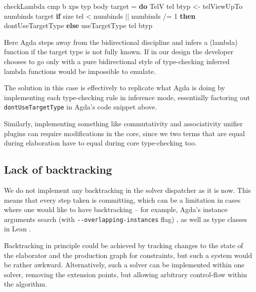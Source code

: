 \documentclass[
  sigconf,
  screen,
  review]{acmart}
\newenvironment{Shaded}{}{}
\newcommand{\DataTypeTok}[1]{\textcolor[rgb]{0.56,0.13,0.00}{#1}}
\newcommand{\DecValTok}[1]{\textcolor[rgb]{0.25,0.63,0.44}{#1}}
\newcommand{\KeywordTok}[1]{\textcolor[rgb]{0.00,0.44,0.13}{\textbf{#1}}}
\newcommand{\NormalTok}[1]{#1}
\newcommand{\OperatorTok}[1]{\textcolor[rgb]{0.40,0.40,0.40}{#1}}
\newcommand{\OtherTok}[1]{\textcolor[rgb]{0.00,0.44,0.13}{#1}}
\begin{document}
\begin{Shaded}
\begin{Highlighting}[]
\NormalTok{checkLambda\textquotesingle{} cmp b xps typ body target }\OtherTok{=} \KeywordTok{do}
  \DataTypeTok{TelV}\NormalTok{ tel btyp }\OtherTok{\textless{}{-}}\NormalTok{ telViewUpTo numbinds target}
  \KeywordTok{if}\NormalTok{ size tel }\OperatorTok{\textless{}}\NormalTok{ numbinds }\OperatorTok{||}\NormalTok{ numbinds }\OperatorTok{/=} \DecValTok{1}
    \KeywordTok{then}\NormalTok{ dontUseTargetType}
    \KeywordTok{else}\NormalTok{ useTargetType tel btyp}
\end{Highlighting}
\end{Shaded}

Here Agda steps away from the bidirectional discipline and infers a
(lambda) function if the target type is not fully known. If in our
design the developer chooses to go only with a pure bidirectional style
of type-checking inferred lambda functions would be impossible to
emulate.

The solution in this case is effectively to replicate what Agda is doing
by implementing each type-checking rule in inference mode, essentially
factoring out \texttt{dontUseTargetType} in Agda's code snippet above.

Similarly, implementing something like commutativity and associativity
unifier plugins can require modifications in the core, since we two
terms that are equal during elaboration have to equal during core
type-checking too.

\hypertarget{lack-of-backtracking}{%
\subsection{Lack of backtracking}\label{lack-of-backtracking}}

We do not implement any backtracking in the solver dispatcher as it is
now. This means that every step taken is committing, which can be a
limitation in cases where one would like to have backtracking -- for
example, Agda's instance arguments search (with
\texttt{-\/-overlapping-instances} flag)
\citep[chap.~3.18]{theagdateamAgdaUserManual2023a}, as well as type
classes in Lean \citep{selsamTabledTypeclassResolution2020}.

Backtracking in principle could be achieved by tracking changes to the
state of the elaborator and the production graph for constraints, but
such a system would be rather awkward. Alternatively, such a solver can
be implemented within one solver, removing the extension points, but
allowing arbitrary control-flow within the algorithm.
\end{document}

